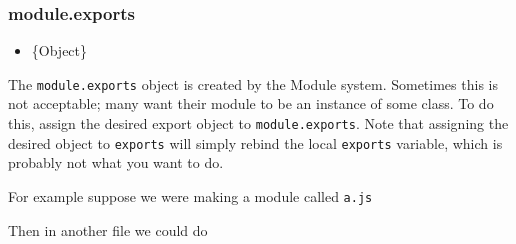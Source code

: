 \subsubsection{module.exports}\label{module.exports}

\begin{itemize}
\itemsep1pt\parskip0pt
\item
  \{Object\}
\end{itemize}

The \texttt{module.exports} object is created by the Module system.
Sometimes this is not acceptable; many want their module to be an
instance of some class. To do this, assign the desired export object to
\texttt{module.exports}. Note that assigning the desired object to
\texttt{exports} will simply rebind the local \texttt{exports} variable,
which is probably not what you want to do.

For example suppose we were making a module called \texttt{a.js}

\begin{Shaded}
\begin{Highlighting}[]
 \NormalTok{(}\NormalTok{;}

 \NormalTok{= } \NormalTok{();}

\NormalTok{(}\NormalTok{() \{}
  \NormalTok{(}\NormalTok{);}
\NormalTok{\}, }\NormalTok{);}
\end{Highlighting}
\end{Shaded}

Then in another file we could do

\begin{Shaded}
\begin{Highlighting}[]
 \NormalTok{(}\NormalTok{);}
\NormalTok{(}\NormalTok{, }\NormalTok{() \{}
  \NormalTok{(}\NormalTok{);}
\NormalTok{\});}
\end{Highlighting}
\end{Shaded}

